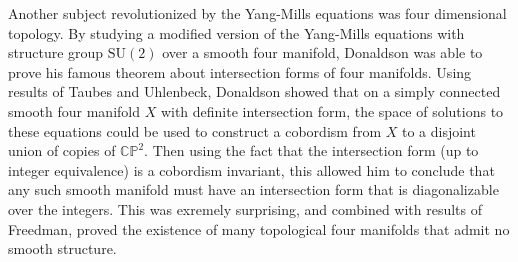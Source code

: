 \documentclass[psamsfonts, 12pt]{amsart}
\theoremstyle{definition}
\theoremstyle{remark}
\newcommand{\CP}{\mathbb{CP}}
\begin{document}
Another subject revolutionized by the Yang-Mills equations was four dimensional
topology. By studying a modified version of the Yang-Mills equations with structure
group $\mathrm{SU}(2)$ over a smooth four manifold, Donaldson was able to prove his
famous theorem about intersection forms of four manifolds. Using results of
Taubes and Uhlenbeck, Donaldson showed that on a simply connected smooth four manifold
$X$ with definite intersection form, the space of solutions to these equations
could be used to construct a cobordism from $X$ to a disjoint union of copies
of $\CP^2$. Then using the fact that the intersection form (up to integer equivalence)
is a cobordism invariant, this allowed him to conclude that any such smooth manifold
must have an intersection form that is diagonalizable over the integers. This was
exremely surprising, and combined with results of Freedman, proved the existence of
many topological four manifolds that admit no smooth structure.
%
\end{document}
